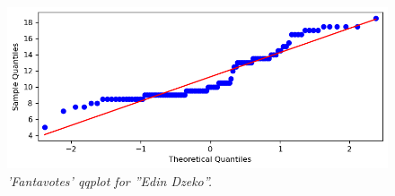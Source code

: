\begin{figure}[H]
  \includegraphics[scale=0.5]{images/dzeko_normality_test_fantavoti_qqplot.png}
   \centering  
   \caption{\textit{'Fantavotes' qqplot for ''Edin Dzeko''.}}
  \label{fig:qqplot_fantavotes}
\end{figure}






  
